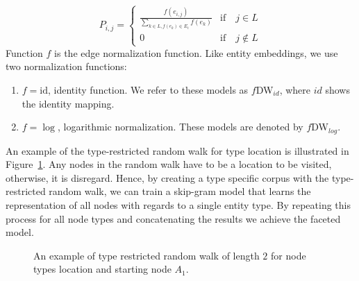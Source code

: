 \begin{equation}
P_{ i,j }=\left\{ 
\begin{matrix}
 \frac { f(e_{ i,j }) }{ \sum _{ k\in L,f(e_{ k })\in E_{ i } }^{  }{ f(e_{ k }) }  }  & \mathrm{if}\quad j\in L \\
0 & \mathrm{if}\quad j\notin L
\end{matrix} 
\right. 
\label{eq:transition_type_restricted}
\end{equation} 
\noindent
Function $f$ is the edge normalization function. Like entity embeddings, we use two normalization functions: \\
\begin{enumerate}
\item  $f=\mathrm{id}$, identity function. We refer to these models as $f$DW$_{id}$, where $id$ shows the identity mapping. \\
\item  $f=\log$, logarithmic normalization. These models are denoted by  $f$DW$_{log}$.\\
\end{enumerate}
\noindent
An example of the type-restricted random walk for type location is illustrated in Figure~\ref{fig:facetteddeepwalk}. Any nodes in the random walk have to be a location to be visited, otherwise, it is disregard. Hence, by creating a type specific corpus with the type-restricted random walk, we can train a skip-gram model that learns the representation of all nodes with regards to a single entity type. By repeating this process for all node types and concatenating the results we achieve the faceted model.
\begin{figure}
\centering 
\resizebox{0.60\textwidth}{0.27\textwidth}{      

}
\caption{An example of type restricted random walk of length $2$ for node types location and starting node $A_1$.}
\label{fig:facetteddeepwalk}
\end{figure} 
